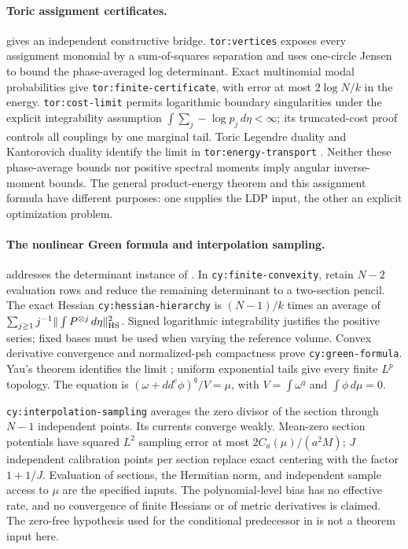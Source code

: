 \paragraph{Toric assignment certificates.}
 gives an independent constructive
bridge. \texttt{tor:vertices} exposes every assignment monomial by a
sum-of-squares separation and uses one-circle Jensen to bound the
phase-averaged log determinant. Exact multinomial modal probabilities
give \texttt{tor:finite-certificate}, with error at most
$2\log N/k$ in the energy. \texttt{tor:cost-limit} permits logarithmic
boundary singularities under the explicit integrability assumption
$\int\sum_j-\log p_j\,d\eta<\infty$; its truncated-cost proof controls
all couplings by one marginal tail. Toric Legendre duality and
Kantorovich duality identify the limit in \texttt{tor:energy-transport}
\citep{BermanWittNystrom2014,BBGZ2013}. Neither these phase-average
bounds nor positive spectral moments imply angular inverse-moment
bounds. The general product-energy theorem and this assignment formula
have different purposes: one supplies the LDP input, the other an
explicit optimization problem.

\paragraph{The nonlinear Green formula and interpolation sampling.}
 addresses the determinant instance of
\citet[Problem 4.10 and Conjecture 6.1]{prob_berman2017}.
In \texttt{cy:finite-convexity}, retain $N-2$ evaluation rows and reduce
the remaining determinant to a two-section pencil. The exact Hessian
\texttt{cy:hessian-hierarchy} is $(N-1)/k$ times an average of
$\sum_{j\ge1}j^{-1}\|\int P^{\otimes j}\,d\eta\|_{\rm HS}^2$.
Signed logarithmic integrability justifies the positive series; fixed
bases must be used when varying the reference volume. Convex derivative
convergence and normalized-psh compactness prove
\texttt{cy:green-formula}. Yau's theorem identifies the limit
\citep{Yau1978}; uniform exponential tails give every finite $L^p$
topology. The equation is $(\omega+dd^c\phi)^q/V=\mu$, with
$V=\int\omega^q$ and $\int\phi\,d\mu=0$.

\texttt{cy:interpolation-sampling} averages the zero divisor of the
section through $N-1$ independent points. Its currents converge weakly.
Mean-zero section potentials have squared $L^2$ sampling error at most
$2C_a(\mu)/(a^2M)$; $J$ independent calibration points per section
replace exact centering with the factor $1+1/J$. Evaluation of sections,
the Hermitian norm, and independent sample access to $\mu$ are the
specified inputs. The polynomial-level bias has no effective rate, and
no convergence of finite Hessians or of metric derivatives is claimed.
The zero-free hypothesis used for the conditional predecessor in
\citet[Theorems 3.2--3.3]{Berman2023zeta} is not a theorem input here.

